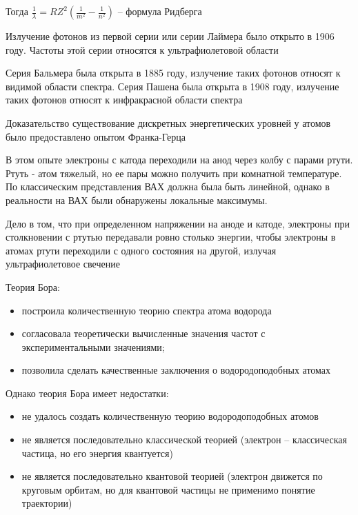\documentclass[12pt]{article}
\begin{document}
Тогда $\frac{1}{\lambda} = R Z^2 \left(\frac{1}{m^2} - \frac{1}{n^2}\right)$ -- формула Ридберга

Излучение фотонов из первой серии или серии Лаймера было открыто в 1906 году. Частоты этой серии относятся к ультрафиолетовой области

Серия Бальмера была открыта в 1885 году, излучение таких фотонов относят к видимой области спектра. Серия Пашена была открыта в 1908 году, излучение таких фотонов относят к инфракрасной области спектра

\mediumvspace

Доказательство существование дискретных энергетических уровней у атомов было предоставлено опытом Франка-Герца

В этом опыте электроны с катода переходили на анод через колбу с парами ртути. Ртуть - атом тяжелый, но ее пары можно получить при комнатной температуре. По классическим представления ВАХ должна была быть линейной, однако в реальности на ВАХ были обнаружены локальные максимумы. 

Дело в том, что при определенном напряжении на аноде и катоде, электроны при столкновении с ртутью передавали ровно столько энергии, чтобы электроны в атомах ртути переходили с одного состояния на другой, излучая ультрафиолетовое свечение

\mediumvspace

Теория Бора:

\begin{itemize}
    \item построила количественную теорию спектра атома водорода
    \item согласовала теоретически вычисленные значения частот с экспериментальными значениями;
    \item позволила сделать качественные заключения о водородоподобных атомах
\end{itemize}

Однако теория Бора имеет недостатки:

\begin{itemize}
    \item не удалось создать количественную теорию водородоподобных атомов
    \item не является последовательно классической теорией (электрон -- классическая частица, но его энергия квантуется)
    \item не является последовательно квантовой теорией (электрон движется по круговым орбитам, но для квантовой частицы не применимо понятие траектории)
\end{itemize}
\end{document}
